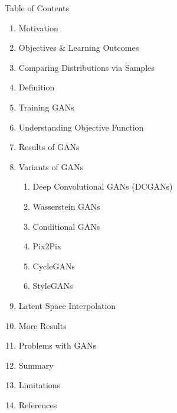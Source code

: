 \begin{frame}[allowframebreaks]{Table of Contents}
\begin{enumerate}
    \item Motivation
    \item Objectives \& Learning Outcomes
    \item Comparing Distributions via Samples
    \item Definition
    \item Training GANs
    \item Understanding Objective Function
    \item Results of GANs
    \item Variants of GANs
    \begin{enumerate}
        \item Deep Convolutional GANs (DCGANs)
        \item Wasserstein GANs
        \item Conditional GANs
        \item Pix2Pix
        \item CycleGANs
        \item StyleGANs
    \end{enumerate}
    \item Latent Space Interpolation
    \item More Results
    \item Problems with GANs
    \item Summary
    \item Limitations
    \item References
\end{enumerate}
\end{frame}
